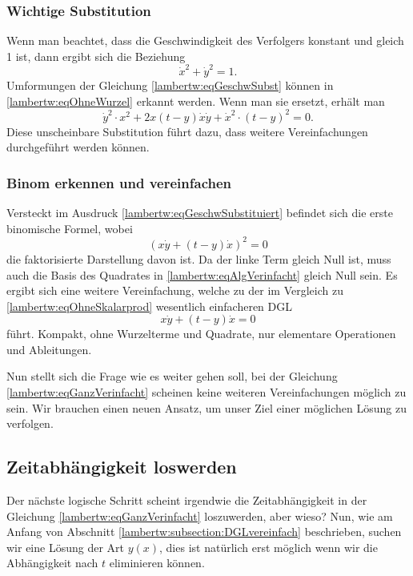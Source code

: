 \subsubsection{Wichtige Substitution
	\label{lambertw:subsubsection:WichtSubst}}
Wenn man beachtet, dass die Geschwindigkeit des Verfolgers konstant und gleich 1 ist, dann ergibt sich die Beziehung  
\begin{equation}
	\dot{x}^2 + \dot{y}^2 
	= 1.
	\label{lambertw:eqGeschwSubst}
\end{equation}
Umformungen der Gleichung \eqref{lambertw:eqGeschwSubst} können in \eqref{lambertw:eqOhneWurzel} erkannt werden. Wenn man sie ersetzt, erhält man
\begin{equation}
		\dot{y}^2 \cdot x^2 +2x \left(t-y\right) \dot{x}\dot{y} + \dot{x}^2 \cdot \left(t-y\right)^2
		=0.
		\label{lambertw:eqGeschwSubstituiert}
\end{equation}
Diese unscheinbare Substitution führt dazu, dass weitere Vereinfachungen durchgeführt werden können.

\subsubsection{Binom erkennen und vereinfachen
	\label{lambertw:subsubsection:BinomVereinfach}}
Versteckt im Ausdruck \eqref{lambertw:eqGeschwSubstituiert} befindet sich die erste binomische Formel, wobei
\begin{equation}
	(x \dot{y} + (t-y) \dot{x})^2
	= 0
	\label{lambertw:eqAlgVerinfacht}
\end{equation}
die faktorisierte Darstellung davon ist.
Da der linke Term gleich Null ist, muss auch die Basis des Quadrates in \eqref{lambertw:eqAlgVerinfacht} gleich Null sein. Es ergibt sich eine weitere Vereinfachung, welche zu der im Vergleich zu \eqref{lambertw:eqOhneSkalarprod} wesentlich einfacheren DGL 
\begin{equation}
	x \dot{y} + (t-y) \dot{x}
	= 0
	\label{lambertw:eqGanzVerinfacht}
\end{equation}
führt.
Kompakt, ohne Wurzelterme und Quadrate, nur elementare Operationen und Ableitungen. 

Nun stellt sich die Frage wie es weiter gehen soll, bei der Gleichung \eqref{lambertw:eqGanzVerinfacht} scheinen keine weiteren Vereinfachungen möglich zu sein. Wir brauchen einen neuen Ansatz, um unser Ziel einer möglichen Lösung zu verfolgen.

\subsection{Zeitabhängigkeit loswerden
	\label{lambertw:subsection:ZeitabhLoswerden}}
Der nächste logische Schritt scheint irgendwie die Zeitabhängigkeit in der Gleichung \eqref{lambertw:eqGanzVerinfacht} loszuwerden, aber wieso? Nun, wie am Anfang von Abschnitt \ref{lambertw:subsection:DGLvereinfach} beschrieben, suchen wir eine Lösung der Art \(y(x)\), dies ist natürlich erst möglich wenn wir die Abhängigkeit nach \(t\) eliminieren können.

